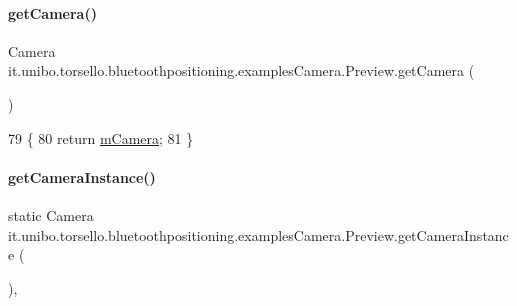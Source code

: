 \paragraph{\texorpdfstring{get\+Camera()}{getCamera()}}
{\footnotesize\ttfamily Camera it.\+unibo.\+torsello.\+bluetoothpositioning.\+examples\+Camera.\+Preview.\+get\+Camera (\begin{DoxyParamCaption}{ }\end{DoxyParamCaption})}


\begin{DoxyCode}
79                               \{
80         \textcolor{keywordflow}{return} \hyperlink{classit_1_1unibo_1_1torsello_1_1bluetoothpositioning_1_1examplesCamera_1_1Preview_a1690c2d132a340b5726ef9712e961dd9_a1690c2d132a340b5726ef9712e961dd9}{mCamera};
81     \}
\end{DoxyCode}
\hypertarget{classit_1_1unibo_1_1torsello_1_1bluetoothpositioning_1_1examplesCamera_1_1Preview_a89ed563293f04de8313a866702452738_a89ed563293f04de8313a866702452738}{}\label{classit_1_1unibo_1_1torsello_1_1bluetoothpositioning_1_1examplesCamera_1_1Preview_a89ed563293f04de8313a866702452738_a89ed563293f04de8313a866702452738} 
\paragraph{\texorpdfstring{get\+Camera\+Instance()}{getCameraInstance()}}
{\footnotesize\ttfamily static Camera it.\+unibo.\+torsello.\+bluetoothpositioning.\+examples\+Camera.\+Preview.\+get\+Camera\+Instance (\begin{DoxyParamCaption}{ }\end{DoxyParamCaption})\hspace{0.3cm}{\ttfamily [static]}, {\ttfamily [private]}}

